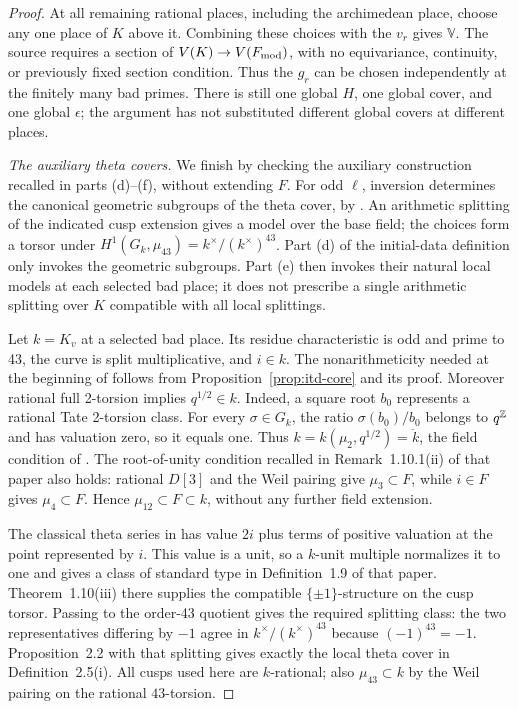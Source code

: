\begin{proof}
At all remaining rational places, including the archimedean place,
choose any one place of $K$ above it. Combining these choices with
the $v_r$ gives $\mathbb V$. The source requires a section of
$V(K)\to V(F_{\rm mod})$, with no equivariance, continuity, or
previously fixed section condition. Thus the $g_r$ can be chosen
independently at the finitely many bad primes. There is still one
global $H$, one global cover, and one global $\epsilon$; the
argument has not substituted different global covers at different
places.

\smallskip\noindent
\emph{The auxiliary theta covers.}
We finish by checking the auxiliary construction recalled in
parts (d)--(f), without extending $F$. For odd $\ell$, inversion
determines the canonical geometric subgroups of the theta cover,
by \cite[Proposition~2.2]{MochEtaleTheta}. An arithmetic splitting
of the indicated cusp extension gives a model over the base
field; the choices form a torsor under
$H^1(G_k,\mu_{43})=k^\times/(k^\times)^{43}$. Part (d) of the
initial-data definition only invokes the geometric subgroups.
Part (e) then invokes their natural local models at each selected
bad place; it does not prescribe a single arithmetic splitting
over $K$ compatible with all local splittings.

Let $k=K_v$ at a selected bad place. Its residue characteristic
is odd and prime to 43, the curve is split multiplicative, and
$i\in k$. The nonarithmeticity needed at the beginning of
\cite[Section~2]{MochEtaleTheta} follows from
Proposition~\ref{prop:itd-core} and its proof. Moreover rational
full 2-torsion implies $q^{1/2}\in k$. Indeed, a square root
$b_0$ represents a rational Tate 2-torsion class. For every
$\sigma\in G_k$, the ratio $\sigma(b_0)/b_0$ belongs to
$q^\mathbb Z$ and has valuation zero, so it equals one. Thus
$k=k(\mu_2,q^{1/2})=\ddot k$, the field condition of
\cite[Definition~2.5]{MochEtaleTheta}.
The root-of-unity condition recalled in Remark~1.10.1(ii) of
that paper also holds: rational $D[3]$ and the Weil pairing give
$\mu_3\subset F$, while $i\in F$ gives $\mu_4\subset F$.
Hence $\mu_{12}\subset F\subset k$, without any further field
extension.

The classical theta series in
\cite[Proposition~1.4]{MochEtaleTheta} has value $2i$ plus terms
of positive valuation at the point represented by $i$. This
value is a unit, so a $k$-unit multiple normalizes it to one and
gives a class of standard type in Definition~1.9 of that paper.
Theorem~1.10(iii) there supplies the compatible
$\{\pm1\}$-structure on the cusp torsor. Passing to the
order-43 quotient gives the required splitting class: the two
representatives differing by $-1$ agree in
$k^\times/(k^\times)^{43}$ because $(-1)^{43}=-1$.
Proposition~2.2 with that splitting gives exactly the local
theta cover in Definition~2.5(i). All cusps used here are
$k$-rational; also $\mu_{43}\subset k$ by the Weil pairing on
the rational $43$-torsion.


\end{proof}
